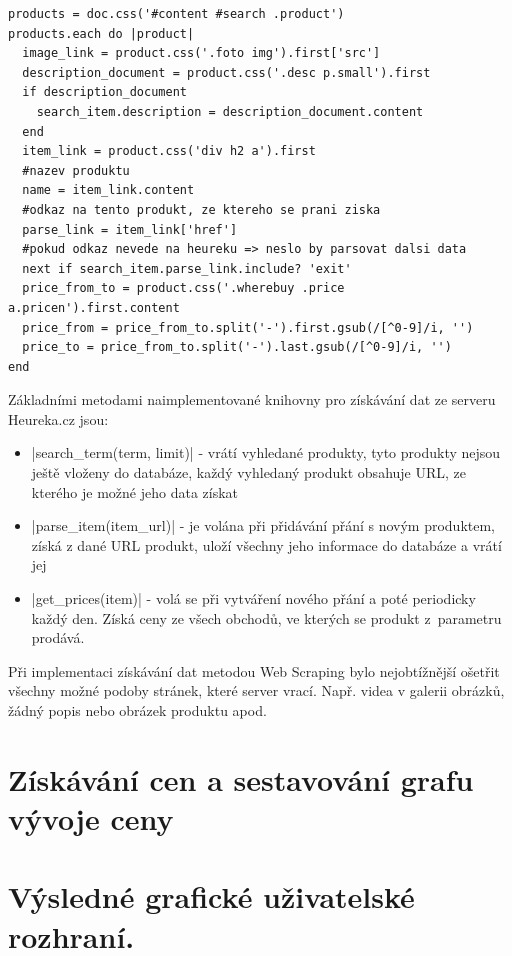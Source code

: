 \begin{lstlisting}
products = doc.css('#content #search .product')
products.each do |product|
  image_link = product.css('.foto img').first['src']
  description_document = product.css('.desc p.small').first
  if description_document
    search_item.description = description_document.content
  end
  item_link = product.css('div h2 a').first
  #nazev produktu
  name = item_link.content
  #odkaz na tento produkt, ze ktereho se prani ziska
  parse_link = item_link['href']
  #pokud odkaz nevede na heureku => neslo by parsovat dalsi data
  next if search_item.parse_link.include? 'exit'
  price_from_to = product.css('.wherebuy .price a.pricen').first.content
  price_from = price_from_to.split('-').first.gsub(/[^0-9]/i, '')
  price_to = price_from_to.split('-').last.gsub(/[^0-9]/i, '')
end
\end{lstlisting}

Základními metodami naimplementované knihovny pro získávání dat ze serveru Heureka.cz jsou:

\begin{itemize}
\item |search_term(term, limit)| - vrátí vyhledané produkty, tyto produkty nejsou ještě vloženy do databáze, každý vyhledaný produkt obsahuje URL, ze kterého je možné jeho data získat
\item |parse_item(item_url)| - je volána při přidávání přání s novým produktem, získá z dané URL produkt, uloží všechny jeho informace do databáze a vrátí jej
\item |get_prices(item)| - volá se při vytváření nového přání a poté periodicky každý den. Získá ceny ze všech obchodů, ve kterých se produkt z~parametru prodává.
\end{itemize}

Při implementaci získávání dat metodou Web Scraping bylo nejobtížnější ošetřit všechny možné podoby stránek, které server vrací. Např. videa v galerii obrázků, žádný popis nebo obrázek produktu apod.

\section{Získávání cen a sestavování grafu vývoje ceny}

\section{Výsledné grafické uživatelské rozhraní.}
